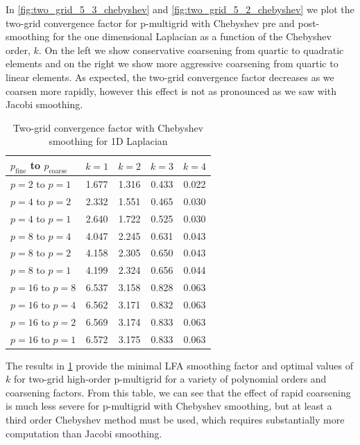 \documentclass[review]{siamart190516}
\begin{document}
In \cref{fig:two_grid_5_3_chebyshev} and \cref{fig:two_grid_5_2_chebyshev} we plot the two-grid convergence factor for p-multigrid with Chebyshev pre and post-smoothing for the one dimensional Laplacian as a function of the Chebyshev order, $k$.
On the left we show conservative coarsening from quartic to quadratic elements and on the right we show more aggressive coarsening from quartic to linear elements.
As expected, the two-grid convergence factor decreases as we coarsen more rapidly, however this effect is not as pronounced as we saw with Jacobi smoothing.

\begin{table}[ht!]
\begin{center}
\begin{tabular}{l c c c c}
  \toprule
  $p_{\text{fine}}$ to $p_{\text{coarse}}$  &  $k = 1$   &  $k = 2$   &  $k = 3$   &  $k = 4$   \\
  \toprule
  $p = 2$ to $p = 1$   &  1.677  &  1.316  &  0.433  &  0.022  \\
  \midrule
  $p = 4$ to $p = 2$   &  2.332  &  1.551  &  0.465  &  0.030  \\
  $p = 4$ to $p = 1$   &  2.640  &  1.722  &  0.525  &  0.030  \\
  \midrule
  $p = 8$ to $p = 4$   &  4.047  &  2.245  &  0.631  &  0.043  \\
  $p = 8$ to $p = 2$   &  4.158  &  2.305  &  0.650  &  0.043  \\
  $p = 8$ to $p = 1$   &  4.199  &  2.324  &  0.656  &  0.044  \\
  \midrule
  $p = 16$ to $p = 8$  &  6.537  &  3.158  &  0.828  &  0.063  \\
  $p = 16$ to $p = 4$  &  6.562  &  3.171  &  0.832  &  0.063  \\
  $p = 16$ to $p = 2$  &  6.569  &  3.174  &  0.833  &  0.063  \\
  $p = 16$ to $p = 1$  &  6.572  &  3.175  &  0.833  &  0.063  \\
  \bottomrule
\end{tabular}
\end{center}
\caption{Two-grid convergence factor with Chebyshev smoothing for 1D Laplacian}
\label{table:two_grid_1d_chebyshev}
\end{table}

The results in \cref{table:two_grid_1d_chebyshev} provide the minimal LFA smoothing factor and optimal values of $k$ for two-grid high-order p-multigrid for a variety of polynomial orders and coarsening factors.
From this table, we can see that the effect of rapid coarsening is much less severe for p-multigrid with Chebyshev smoothing, but at least a third order Chebyshev method must be used, which requires substantially more computation than Jacobi smoothing.
\end{document}
